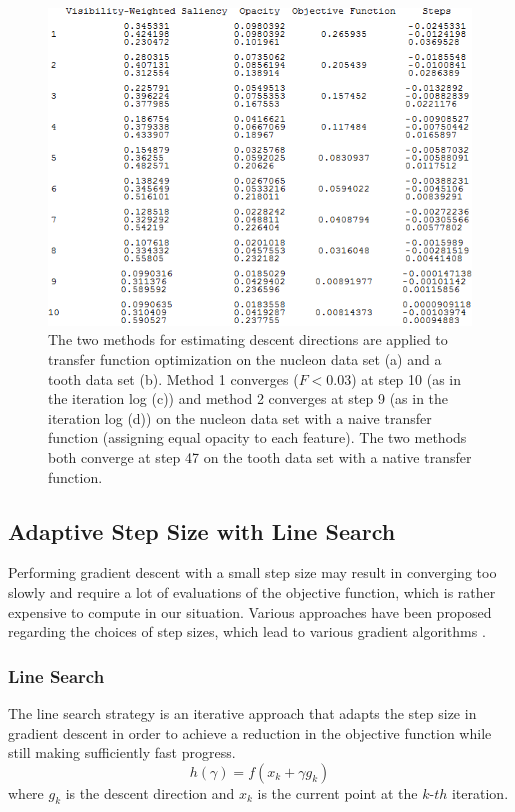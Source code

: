 \begin{figure}
\begin{minipage}{.49\textwidth}
		\subcaption{}	
	\end{minipage}~
	\begin{minipage}{.49\textwidth}
		\includegraphics[width=1\linewidth]{images/nucleon_naive_table_newton}
		\subcaption{}	
	\end{minipage}
	\caption[The two methods for estimating descent directions are applied to transfer function optimization on the nucleon data set and a tooth data set]{The two methods for estimating descent directions are applied to transfer function optimization on the nucleon data set (a) and a tooth data set (b).
		Method 1 converges ($F<0.03$) at step 10 (as in the iteration log (c)) and method 2 converges at step 9 (as in the iteration log (d)) on the nucleon data set with a naive transfer function (assigning equal opacity to each feature).
		The two methods both converge at step 47 on the tooth data set with a native transfer function.}
	\label{fig:nucleon_naive_tooth_naive_rms}
\end{figure}

\subsection{Adaptive Step Size with Line Search}
Performing gradient descent with a small step size may result in converging too slowly and require a lot of evaluations of the objective function, which is rather expensive to compute in our situation. Various approaches have been proposed regarding the choices of step sizes, which lead to various gradient algorithms \cite{yuan_step-sizes_2008}.

\subsubsection{Line Search}
The line search strategy is an iterative approach that adapts the step size in gradient descent in order to achieve a reduction in the objective function while still making sufficiently fast progress.
\[ h( \gamma)=f(x_{k}+\gamma g_{k}) \]
where $ g_{k} $ is the descent direction and $ x_{k} $ is the current point at the $ k$-$th $ iteration.

